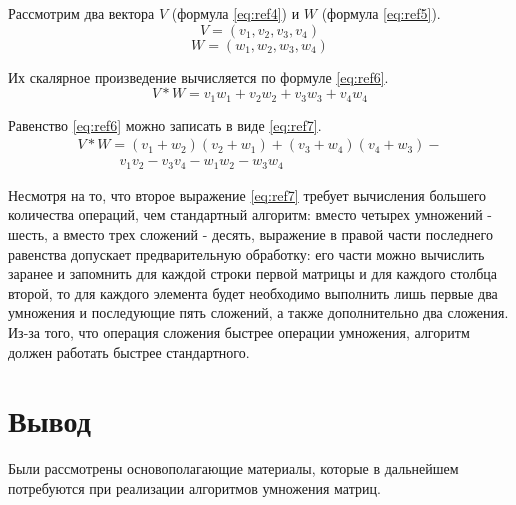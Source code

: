 Рассмотрим два вектора $V$ (формула \ref{eq:ref4}) и $W$ (формула \ref{eq:ref5}).
\begin{equation}
	V = (v_1, v_2, v_3, v_4)
	\label{eq:ref4}
\end{equation}
\begin{equation}
	W = (w_1, w_2, w_3, w_4)
	\label{eq:ref5}
\end{equation}

Их скалярное произведение вычисляется по формуле  \ref{eq:ref6}.
\begin{equation}
	V * W = v_1w_1 + v_2w_2 + v_3w_3 + v_4w_4
	\label{eq:ref6}
\end{equation}

Равенство \ref{eq:ref6} можно записать в виде \ref{eq:ref7}.
\begin{equation}
	\begin{array}{l}
		V * W = (v_1 + w_2)(v_2 + w_1) + (v_3 + w_4)(v_4 + w_3) - \\
		\quad \quad \quad v_1v_2 - v_3v_4 - w_1w_2 - w_3w_4
	\end{array}
	\label{eq:ref7}
\end{equation}

Несмотря на то, что второе выражение \ref{eq:ref7} требует вычисления большего количества операций, чем стандартный алгоритм: вместо четырех умножений - шесть, а вместо трех сложений - десять, выражение в правой части последнего равенства допускает предварительную обработку: его части можно вычислить заранее и запомнить для каждой строки первой матрицы и для каждого столбца второй, то для каждого элемента будет необходимо выполнить лишь первые два умножения и последующие пять сложений, а также дополнительно два сложения. 
Из-за того, что операция сложения быстрее операции умножения, алгоритм должен работать быстрее стандартного.

\section*{Вывод}

Были рассмотрены основополагающие материалы, которые в дальнейшем потребуются при реализации алгоритмов умножения матриц.

